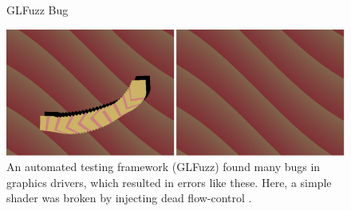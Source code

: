 \documentclass[a4paper,12pt,twoside,openright]{report}
\begin{document}
\begin{itemize}



\end{itemize}

\begin{figure}[h]
\begin{center}
GLFuzz Bug
\end{center}
\centering
\includegraphics[width=0.8\linewidth]{glfuzz}
\caption{An automated testing framework (GLFuzz) found many bugs in graphics drivers,
which resulted in errors like these. Here, a simple shader was broken by
injecting dead flow-control \cite{GLFuzz}.}
\label{fig:glfuzz}
\end{figure}

\end{document}
